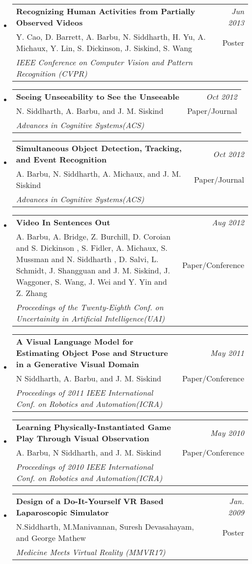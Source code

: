 \documentclass[10pt]{article}
\makeatletter
\newenvironment{publication}[6]
{ \item
  \begin{tabular*}{6.5in}{p{5.2in}@{\extracolsep{\fill}}r}
    \textbf{#1} & \textit{#2}\\ #3 & \footnotesize{#4}\\ \textit{#5}\\ #6
  \end{tabular*}
} {}
\newenvironment{region}[1] {{\large \textbf{#1}} \begin{itemize}} {\end{itemize}}
\makeatother
\begin{document}
\begin{region} {Publications / Posters}
  \begin{publication} {Recognizing Human Activities from Partially Observed Videos}
    {Jun 2013}
    {Y. Cao, D. Barrett, A. Barbu, N. Siddharth, H. Yu, A. Michaux, Y. Lin,
      S. Dickinson, J. Siskind, S. Wang}
    {Poster}
    {IEEE Conference on Computer Vision and Pattern Recognition (CVPR)}
    {}
  \end{publication}
  \begin{publication} {Seeing Unseeability to See the Unseeable}
    {Oct 2012}
    {N. Siddharth, A. Barbu, and J. M. Siskind}
    {Paper/Journal}
    {Advances in Cognitive Systems(ACS)}
    {}
  \end{publication}
  \begin{publication} {Simultaneous Object Detection, Tracking, and Event Recognition}
    {Oct 2012}
    {A. Barbu, N. Siddharth, A. Michaux, and J. M. Siskind}
    {Paper/Journal}
    {Advances in Cognitive Systems(ACS)}
    {}
  \end{publication}
  \begin{publication} {Video In Sentences Out}
    {Aug 2012}
    {A. Barbu, A. Bridge, Z. Burchill, D. Coroian and S. Dickinson , S. Fidler,
      A. Michaux, S. Mussman and N. Siddharth , D. Salvi, L. Schmidt, J. Shangguan and
      J. M. Siskind, J. Waggoner, S. Wang, J. Wei and Y. Yin and Z. Zhang}
    {Paper/Conference}
    {Proceedings of the Twenty-Eighth Conf. on Uncertainity in Artificial Intelligence(UAI)}
    {}
  \end{publication}
  \begin{publication} {A Visual Language Model for Estimating Object
      Pose and Structure in a Generative Visual Domain}
    {May 2011}
    {N Siddharth, A. Barbu, and J. M. Siskind}
    {Paper/Conference}
    {Proceedings of 2011 IEEE International Conf. on Robotics and Automation(ICRA)}
    {}
  \end{publication}
  \begin{publication}{Learning Physically-Instantiated Game Play Through Visual Observation}
    {May 2010}
    {A. Barbu, N Siddharth, and J. M. Siskind}
    {Paper/Conference}
    {Proceedings of 2010 IEEE International Conf. on Robotics and Automation(ICRA)}
    {}
  \end{publication}
  \begin{publication} {Design of a Do-It-Yourself VR Based Laparoscopic Simulator}
    {Jan. 2009}
    {N.Siddharth, M.Manivannan, Suresh Devasahayam, and George Mathew}
    {Poster}
    {Medicine Meets Virtual Reality (MMVR17)}
    {}
  \end{publication}
\end{region}
\end{document}
